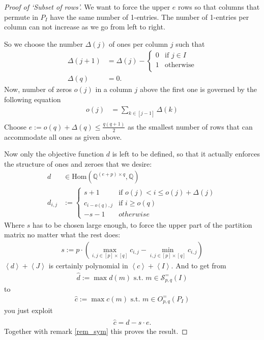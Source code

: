 \documentclass[a4paper]{amsart}
\theoremstyle{lemma}
\theoremstyle{definition}
\theoremstyle{remark}
\theoremstyle{example}
\newcommand{\lr}[1]{\ensuremath{\left( #1 \right)}}
\newcommand{\lrE}[1]{\ensuremath{\left[ #1 \right]}}
\newcommand{\lrX}[1]{\ensuremath{\left< #1 \right>}}
\newcommand{\rationals}{\ensuremath{\mathbb{Q}}}
\newcommand{\Hom}{\ensuremath{\mathrm{Hom}}}
\begin{document}
\begin{proof}[Proof of `Subset of rows']
  We want to force the upper \(e\) rows so that columns that permute
  in \(P_I\) have the same number of 1-entries.  The number of
  1-entries per column can not increase as we go from left to
  right.

  So we choose the number \(\Delta\lr{j}\) of ones per column \(j\) such that
  \begin{align}
    \Delta \lr{j+1} & =  \Delta \lr{j} - \begin{cases} 0 & \text{if } j \in I\\
      1 & \text{otherwise} \\
    \end{cases}\\
    \Delta \lr{q} & = 0 \text{.}
  \end{align}
  Now, number of zeros \(o\lr{j}\) in a column \(j\) above the first one is governed by the following equation
\begin{align}
  o \lr{j} & = \sum_{k \in \lrE{j-1}} \Delta \lr{k} \\
 \end{align}
 Choose \(e := o\lr{q} + \Delta\lr{q} \leq \frac{q \lr{q+1}}{2}\) as
 the smallest number of rows that can accommodate all ones as given
 above.
 
 Now only the objective function \(d\) is left to be defined, so that it
 actually enforces the structure of ones and zeroes that we desire:
 \begin{align}
   d & \in \Hom \lr{\rationals^{\lr{e + p} \times q}, \rationals} \\
   \nonumber
   d_{i,j} & := \begin{cases} s+1 & \text{if } o\lr{j} < i \leq o\lr{j}+\Delta\lr{j}\\
     c_{i-o\lr{q},j} & \text{if } i \geq o\lr{q}\\
     -s-1 & otherwise
     \end{cases}
 \end{align}
 Where \(s\) has to be chosen large enough, to force the upper part of
 the partition matrix no matter what the rest does:
 \begin{align}
   s := p \cdot \lr{\max_{i,j \in \lrE{p}\times \lrE{q}} c_{i,j}
     - \min_{i,j \in \lrE{p}\times \lrE{q}} c_{i,j}}
 \end{align}
 \(\lrX{d}+\lrX{J}\) is certainly polynomial in \(\lrX{c} + \lrX{I}\).  And to get from
 \begin{align}
   \hat{d} := \max d \lr{m} \text{ s.t. } m \in \mathcal{S}^=_{p, q}\lr{I}
 \end{align}
 to
 \begin{align}
   \hat{c} := \max c \lr{m} \text{ s.t. } m \in O^=_{p, q} \lr{P_I}
 \end{align}
 you just exploit
 \begin{align}
   \hat{c} = \hat{d} - s \cdot e \text{.}
 \end{align}
 Together with remark \ref{rem_sym} this proves the result.
\end{proof}



\end{document}
